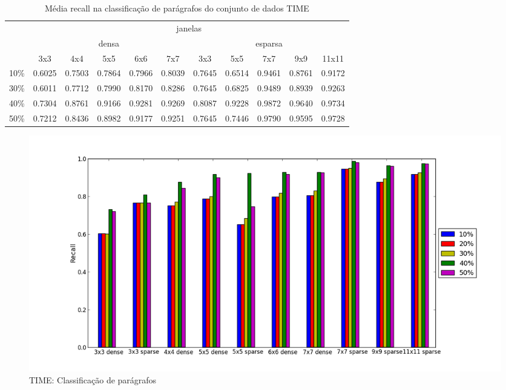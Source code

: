 \documentclass[a4paper,11pt]{article}
\begin{document}
  \begin{center}
    \begin{table}[p]
      \caption{Média recall na classificação de parágrafos do conjunto de dados TIME}
      \begin{tabular}{ l | c c c c c || c c c c c | }
        \cline{2-11}
        & \multicolumn{10}{|c|}{janelas} \\
        \cline{2-11}
        & \multicolumn{5}{c||}{densa} & \multicolumn{5}{c|}{esparsa} \\
        \cline{2-11}
        & 3x3 & 4x4 & 5x5 & 6x6 & 7x7 & 3x3 & 5x5 & 7x7 & 9x9 & 11x11 \\
        \hline
        \multicolumn{1}{|l|}{10\%}& 0.6025& 0.7503& 0.7864& 0.7966& 0.8039& 0.7645& 0.6514& 0.9461& 0.8761& 0.9172\\
        \multicolumn{1}{|l|}{30\%}& 0.6011& 0.7712& 0.7990& 0.8170& 0.8286& 0.7645& 0.6825& 0.9489& 0.8939& 0.9263\\
        \multicolumn{1}{|l|}{40\%}& 0.7304& 0.8761& 0.9166& 0.9281& 0.9269& 0.8087& 0.9228& 0.9872& 0.9640& 0.9734\\
        \multicolumn{1}{|l|}{50\%}& 0.7212& 0.8436& 0.8982& 0.9177& 0.9251& 0.7645& 0.7446& 0.9790& 0.9595& 0.9728\\
        \hline  
      \end{tabular}
      \label{tab:time_recall_paragraph}
    \end{table}
  \end{center}

  \begin{figure}[p]
    \centerline{\includegraphics[width=1.2\textwidth]{assets/experiment_charts/time_TextRegion_paragraph_recall_or_sensitivity.png}}
    \caption{TIME: Classificação de parágrafos}
    \label{fig:time_TextRegion_paragraph_recall_or_sensitivity}
  \end{figure}  
\end{document}
